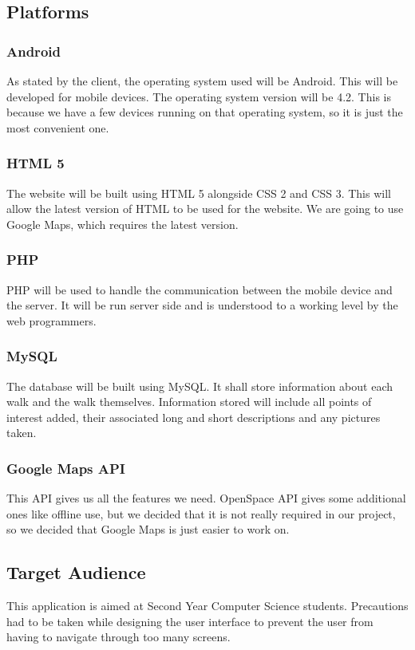 \documentclass[12pt]{article}
\begin{document}
\subsection{Platforms}
\subsubsection{Android}
As stated by the client, the operating system used will be Android. This will be developed for mobile devices. The operating system version will be 4.2. This is because we have a few devices running on that operating system, so it is just the most convenient one.
\subsubsection{HTML 5}
The website will be built using HTML 5 alongside CSS 2 and CSS 3. This will allow the latest version of HTML to be used for the website. We are going to use Google Maps, which requires the latest version.
\subsubsection{PHP}
PHP will be used to handle the communication between the mobile device and the server. It will be run server side and is understood to a working level by the web programmers.
\subsubsection{MySQL}
The database will be built using MySQL. It shall store information about each walk and the walk themselves. Information stored will include all points of interest added, their associated long and short descriptions and any pictures taken.
\subsubsection{Google Maps API}
This API gives us all the features we need. OpenSpace API gives some additional ones like offline use, but we decided that it is not really required in our project, so we decided that Google Maps is just easier to work on. 
\subsection{Target Audience}
This application is aimed at Second Year Computer Science students. Precautions had to be taken while designing the user interface to prevent the user from having to navigate through too many screens. 
\end{document}
